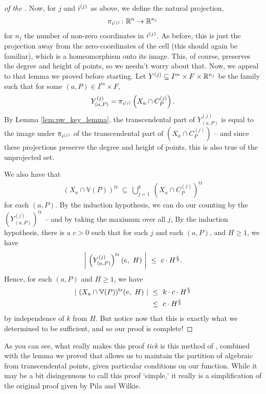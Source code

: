 \begin{proof}[of the \pwT]
    Now, for $j$ and $i^{(j)}$ as above, we define the natural projection,
    \begin{align*}
      \pi_{i^{(j)}} \colon \mathbb{R}^n \to \mathbb{R}^{n_j}
    \end{align*}
    for $n_j$ the number of non-zero coordinates in $i^{(j)}$. As before, this is just the projection away from the zero-coordinates of the cell (this should again be familiar), which is a homeomorphism onto its image. This, of course, preserves the degree and height of points, so we needn't worry about that. Now, we appeal to that lemma we proved before starting. Let $Y^{(j)} \subseteq I^m \times F \times \mathbb{R}^{n_j}$ be the  family such that for some $(a, P) \in I^m \times F$,
    \begin{align*}
      Y^{(j)}_{(a, P)} = \pi_{i^{(j)}} \left( X_a \cap C_{P}^{(j)} \right).
    \end{align*}
    By Lemma \ref{lem:pw_key_lemma}, the transcendental part of $Y^{(j)}_{(a, P)}$ is equal to the image under $\pi_{i^{(j)}}$ of the transcendental part of $\left( X_a \cap C_{P}^{(j)} \right)$ -- and since these projections preserve the degree and height of points, this is also true of the unprojected set.
    
    We also have that 
    \begin{align*}
      (X_a \cap \mathbb{V}(P))^{\textrm{tr}} \ \subseteq \ \bigcup_{j=1}^{k} \ (X_a \cap C_P^{(j)})^{\textrm{tr}}
    \end{align*}
    for each $(a, P)$. By the induction hypothesis, we can do our counting by the $(Y_{(a, P)}^{(j)})^{\textrm{tr}}$ -- and by taking the maximum over all $j$, 
    By the induction hypothesis, there is a $c > 0$ such that for each $j$ and each $(a, P)$, and $H \geq 1$, we have
    \begin{align*}
      \left\vert \ \left( Y^{(j)}_{(a, P)} \right)^{\textrm{tr}} (e, \ H) \ \right\vert \ \leq \ c \cdot H^{\frac{\eps}{2}}.
    \end{align*}
    Hence, for each $(a, P)$ and $H \geq 1$, we have
    \begin{align*}
      \card{ \  (X_a \cap \mathbb{V}(P))^{\textrm{tr}} (e, \ H) \ } \ &\leq \ k \cdot c \cdot H^{\frac{\eps}{2}} \\
                                                                      &\leq \ c \cdot H^{\frac{\eps}{2}}
    \end{align*} 
    by independence of $k$ from $H$. But notice now that this is exactly what we determined to be sufficient, and so our proof is complete!
    \smartqed
\end{proof}

As you can see, what really makes this proof \emph{tick} is this method of \sacd, combined with the lemma we proved that allows us to maintain the partition of algebraic from transcendental points, given particular conditions on our function. While it may be a bit disingenuous to call this proof `simple,' it really is a simplification of the original proof given by Pila and Wilkie. 